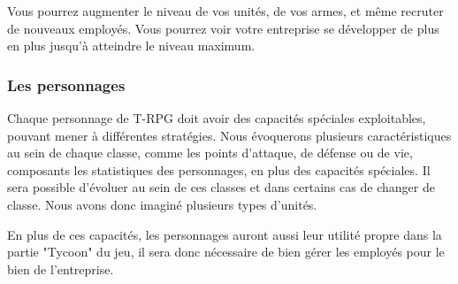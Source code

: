\documentclass{article}
\begin{document}
Vous pourrez augmenter le niveau de vos unités, de vos armes, et même recruter de nouveaux employés. Vous pourrez voir votre entreprise se développer de plus en plus
jusqu'à atteindre le niveau maximum.

\subsubsection{Les personnages}
Chaque personnage de T-RPG doit avoir des capacités spéciales exploitables, pouvant mener à différentes stratégies. Nous évoquerons plusieurs caractéristiques au sein de chaque classe, comme les points d'attaque, de défense ou de vie, composants les statistiques des personnages, en plus des capacités spéciales. Il sera possible d'évoluer au sein de ces classes et dans certains cas de changer de classe. Nous avons donc imaginé plusieurs types d'unités.

En plus de ces capacités, les personnages auront aussi leur utilité propre dans la partie "Tycoon" du jeu, il sera donc nécessaire de bien gérer les employés pour le bien de l'entreprise.\\
\end{document}
